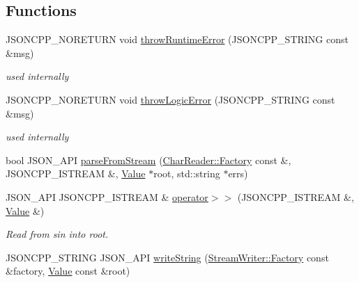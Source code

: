 \subsection*{Functions}
\begin{DoxyCompactItemize}
\item 
J\+S\+O\+N\+C\+P\+P\+\_\+\+N\+O\+R\+E\+T\+U\+RN void \hyperlink{namespaceJson_a0ab7ff7f99788262d92d9ff3d924e065}{throw\+Runtime\+Error} (J\+S\+O\+N\+C\+P\+P\+\_\+\+S\+T\+R\+I\+NG const \&msg)\hypertarget{namespaceJson_a0ab7ff7f99788262d92d9ff3d924e065}{}\label{namespaceJson_a0ab7ff7f99788262d92d9ff3d924e065}

\begin{DoxyCompactList}\small\item\em used internally \end{DoxyCompactList}\item 
J\+S\+O\+N\+C\+P\+P\+\_\+\+N\+O\+R\+E\+T\+U\+RN void \hyperlink{namespaceJson_a27790f21f17922fac81e7cd72a5659a5}{throw\+Logic\+Error} (J\+S\+O\+N\+C\+P\+P\+\_\+\+S\+T\+R\+I\+NG const \&msg)\hypertarget{namespaceJson_a27790f21f17922fac81e7cd72a5659a5}{}\label{namespaceJson_a27790f21f17922fac81e7cd72a5659a5}

\begin{DoxyCompactList}\small\item\em used internally \end{DoxyCompactList}\item 
bool J\+S\+O\+N\+\_\+\+A\+PI \hyperlink{namespaceJson_aab0cf1ecf81d1aeca12be2a416a84352}{parse\+From\+Stream} (\hyperlink{classJson_1_1CharReader_1_1Factory}{Char\+Reader\+::\+Factory} const \&, J\+S\+O\+N\+C\+P\+P\+\_\+\+I\+S\+T\+R\+E\+AM \&, \hyperlink{classJson_1_1Value}{Value} $\ast$root, std\+::string $\ast$errs)
\item 
J\+S\+O\+N\+\_\+\+A\+PI J\+S\+O\+N\+C\+P\+P\+\_\+\+I\+S\+T\+R\+E\+AM \& \hyperlink{namespaceJson_a244ed0996aba750c40c1641c06bba449}{operator$>$$>$} (J\+S\+O\+N\+C\+P\+P\+\_\+\+I\+S\+T\+R\+E\+AM \&, \hyperlink{classJson_1_1Value}{Value} \&)
\begin{DoxyCompactList}\small\item\em Read from \textquotesingle{}sin\textquotesingle{} into \textquotesingle{}root\textquotesingle{}. \end{DoxyCompactList}\item 
J\+S\+O\+N\+C\+P\+P\+\_\+\+S\+T\+R\+I\+NG J\+S\+O\+N\+\_\+\+A\+PI \hyperlink{namespaceJson_a00820c0084189e2a7533531c0f250e3f}{write\+String} (\hyperlink{classJson_1_1StreamWriter_1_1Factory}{Stream\+Writer\+::\+Factory} const \&factory, \hyperlink{classJson_1_1Value}{Value} const \&root)\hypertarget{namespaceJson_a00820c0084189e2a7533531c0f250e3f}{}\label{namespaceJson_a00820c0084189e2a7533531c0f250e3f}


\end{DoxyCompactItemize}
